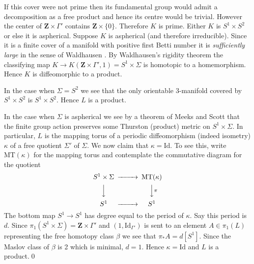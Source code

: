 \documentclass{amsart}
\newcommand{\ZZ}{\mathbf{Z}}
\newcommand{\id}{\mathrm{Id}}
\newcommand{\MT}{\mathrm{MT}}
\begin{document}
If this cover were not prime then its fundamental group would admit a decomposition as a free product and hence its centre would be trivial. However the center of $\ZZ\times\Gamma'$ contains $\ZZ\times\{0\}$. Therefore $K$ is prime. Either $K$ is $S^1\times S^2$ or else it is aspherical. Suppose $K$ is aspherical (and therefore irreducible). Since it is a finite cover of a manifold with positive first Betti number it is \emph{sufficiently large} in the sense of Waldhausen \cite{Wal}. By Waldhausen's rigidity theorem \cite{Wal} the classifying map $K\rightarrow K(\ZZ\times\Gamma',1)=S^1\times\Sigma$ is homotopic to a homemorphism. Hence $K$ is diffeomorphic to a product.

In the case when $\Sigma=S^2$ we see that the only orientable 3-manifold covered by $S^1\times S^2$ is $S^1\times S^2$. Hence $L$ is a product.

In the case when $\Sigma$ is aspherical we see by a theorem of Meeks and Scott {\cite[Theorem 2.1]{MS}} that the finite group action preserves some Thurston (product) metric on $S^1\times\Sigma$. In particular, $L$ is the mapping torus of a periodic diffeomorphism (indeed isometry) $\kappa$ of a free quotient $\Sigma'$ of $\Sigma$. We now claim that $\kappa=\id$. To see this, write $\MT(\kappa)$ for the mapping torus and contemplate the commutative diagram for the quotient
\[\begin{CD}
S^1\times\Sigma@>>>\MT(\kappa)\\
@VVV @VV{\pi}V\\
S^1 @>>> S^1
\end{CD}\]
The bottom map $S^1\rightarrow S^1$ has degree equal to the period of $\kappa$. Say this period is $d$. Since $\pi_1(S^1\times\Sigma)=\ZZ\times\Gamma'$ and $(1,\id_{\Gamma'})$ is sent to an element $A\in\pi_1(L)$ representing the free homotopy class $\beta$ we see that $\pi_*A=d[S^1]$. Since the Maslov class of $\beta$ is 2 which is minimal, $d=1$. Hence $\kappa=\id$ and $L$ is a product.\qed
\end{document}
